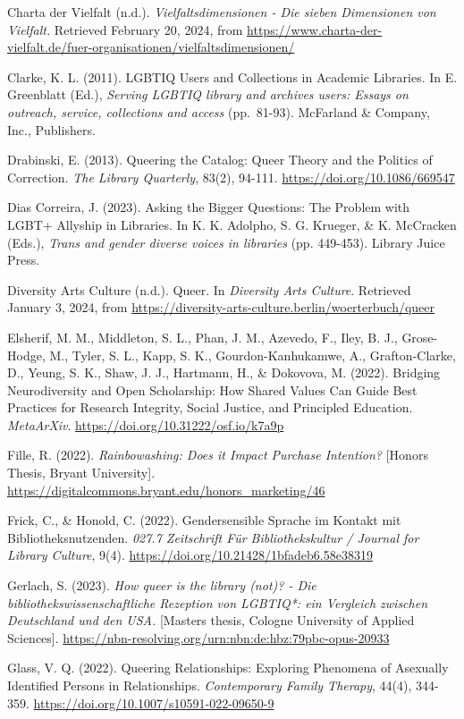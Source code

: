 \documentclass[a4paper,
fontsize=11pt,
oneside,
numbers=noperiodatend,
parskip=half-,
bibliography=totoc,
final
]{scrartcl}
\begin{document}
Charta der Vielfalt (n.d.). \emph{Vielfaltsdimensionen - Die sieben
Dimensionen von Vielfalt.} Retrieved February 20, 2024, from
\url{https://www.charta-der-vielfalt.de/fuer-organisationen/vielfaltsdimensionen/}

Clarke, K. L. (2011). LGBTIQ Users and Collections in Academic
Libraries. In E. Greenblatt (Ed.), \emph{Serving LGBTIQ library and
archives users: Essays on outreach, service, collections and access}
(pp.~81-93). McFarland \& Company, Inc., Publishers.

Drabinski, E. (2013). Queering the Catalog: Queer Theory and the
Politics of Correction. \emph{The Library Quarterly}, 83(2), 94-111.
\url{https://doi.org/10.1086/669547}

Dias Correira, J. (2023). Asking the Bigger Questions: The Problem with
LGBT+ Allyship in Libraries. In K. K. Adolpho, S. G. Krueger, \& K.
McCracken (Eds.), \emph{Trans and gender diverse voices in libraries}
(pp. 449-453). Library Juice Press.

Diversity Arts Culture (n.d.). Queer. In \emph{Diversity Arts Culture}.
Retrieved January 3, 2024, from
\url{https://diversity-arts-culture.berlin/woerterbuch/queer}

Elsherif, M. M., Middleton, S. L., Phan, J. M., Azevedo, F., Iley, B.
J., Grose-Hodge, M., Tyler, S. L., Kapp, S. K., Gourdon-Kanhukamwe, A.,
Grafton-Clarke, D., Yeung, S. K., Shaw, J. J., Hartmann, H., \&
Dokovova, M. (2022). Bridging Neurodiversity and Open Scholarship: How
Shared Values Can Guide Best Practices for Research Integrity, Social
Justice, and Principled Education. \emph{MetaArXiv}.
\url{https://doi.org/10.31222/osf.io/k7a9p}

Fille, R. (2022). \emph{Rainbowashing: Does it Impact Purchase
Intention?} {[}Honors Thesis, Bryant University{]}.
\url{https://digitalcommons.bryant.edu/honors_marketing/46}

Frick, C., \& Honold, C. (2022). Gendersensible Sprache im Kontakt mit
Bibliotheksnutzenden. \emph{027.7 Zeitschrift Für Bibliothekskultur /
Journal for Library Culture}, 9(4).
\url{https://doi.org/10.21428/1bfadeb6.58e38319}

Gerlach, S. (2023). \emph{How queer is the library (not)? - Die
bibliothekswissenschaftliche Rezeption von LGBTIQ*: ein Vergleich
zwischen Deutschland und den USA.} {[}Master\textquotesingle s thesis,
Cologne University of Applied Sciences{]}.
\url{https://nbn-resolving.org/urn:nbn:de:hbz:79pbc-opus-20933}

Glass, V. Q. (2022). Queering Relationships: Exploring Phenomena of
Asexually Identified Persons in Relationships. \emph{Contemporary Family
Therapy}, 44(4), 344-359.
\url{https://doi.org/10.1007/s10591-022-09650-9}
\end{document}
